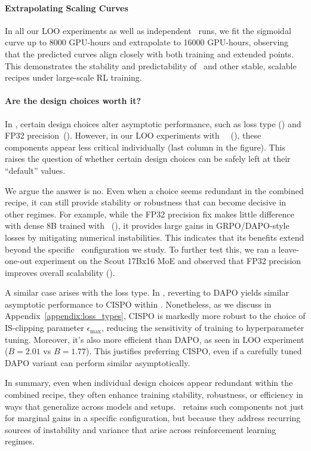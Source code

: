 \paragraph{Extrapolating Scaling Curves}
In all our LOO experiments as well as independent \scalerl\ runs, we fit the sigmoidal curve up to 8000 GPU-hours and extrapolate to 16000 GPU-hours, observing that the predicted curves align closely with both training and extended points. This demonstrates the stability and predictability of \scalerl\ and other stable, scalable recipes under large-scale RL training.

\paragraph{Are the design choices worth it?}
In , certain design choices alter asymptotic performance, such as loss type () and FP32 precision~(). However, in our LOO experiments with \scalerl\ ~(), these components appear less critical individually (last column in the figure). 
This raises the question of whether certain design choices can be safely left at their ``default'' values. 

We argue the answer is no. Even when a choice seems redundant in the combined recipe, it can still provide stability or robustness that can become decisive in other regimes. 
For example, while the FP32 precision fix makes little difference with dense 8B trained with \scalerl\ (), it provides large gains in GRPO/DAPO-style losses by mitigating numerical instabilities. This indicates that its benefits extend beyond the specific \scalerl\ configuration we study. To further test this, we ran a leave-one-out experiment on the Scout 17Bx16 MoE and observed that FP32 precision improves overall scalability (). 

A similar case arises with the loss type. In , reverting to DAPO yields similar asymptotic performance to CISPO within \scalerl. 
Nonetheless, as we discuss in Appendix~\ref{appendix:loss_types}, CISPO is markedly more robust to the choice of IS-clipping parameter $\epsilon_{\max}$, reducing the sensitivity of training to hyperparameter tuning. Moreover, it's also more efficient than DAPO, as seen in LOO experiment ($B=2.01$ vs $B=1.77$).
This justifies preferring CISPO, even if a carefully tuned DAPO variant can perform similar asymptotically. 

In summary, even when individual design choices appear redundant within the combined recipe, they often enhance training stability, robustness, or efficiency in ways that generalize across models and setups. \scalerl\ retains such components not just for marginal gains in a specific configuration, but because they address recurring sources of instability and variance that arise across reinforcement learning regimes.


